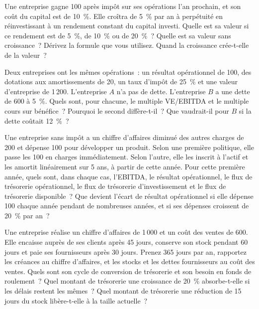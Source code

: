 \begin{question}\label{iq:iv2:valuation-and-financial-statements:12}
Une entreprise gagne 100 après impôt sur ses opérations l'an prochain, et son coût du capital est de 10~\%. Elle croîtra de 5~\% par an à perpétuité en réinvestissant à un rendement constant du capital investi. Quelle est sa valeur si ce rendement est de 5~\%, de 10~\% ou de 20~\%~? Quelle est sa valeur sans croissance~? Dérivez la formule que vous utilisez. Quand la croissance crée-t-elle de la valeur~?
\end{question}

\begin{question}\label{iq:iv2:valuation-and-financial-statements:13}
Deux entreprises ont les mêmes opérations~: un résultat opérationnel de 100, des dotations aux amortissements de 20, un taux d'impôt de 25~\% et une valeur d'entreprise de 1\,200. L'entreprise $A$ n'a pas de dette. L'entreprise $B$ a une dette de 600 à 5~\%. Quels sont, pour chacune, le multiple VE/EBITDA et le multiple cours sur bénéfice~? Pourquoi le second diffère-t-il~? Que vaudrait-il pour $B$ si la dette coûtait 12~\%~?
\end{question}

\begin{question}\label{iq:iv2:valuation-and-financial-statements:14}
Une entreprise sans impôt a un chiffre d'affaires diminué des autres charges de 200 et dépense 100 pour développer un produit. Selon une première politique, elle passe les 100 en charges immédiatement. Selon l'autre, elle les inscrit à l'actif et les amortit linéairement sur 5 ans, à partir de cette année. Pour cette première année, quels sont, dans chaque cas, l'EBITDA, le résultat opérationnel, le flux de trésorerie opérationnel, le flux de trésorerie d'investissement et le flux de trésorerie disponible~? Que devient l'écart de résultat opérationnel si elle dépense 100 chaque année pendant de nombreuses années, et si ses dépenses croissent de 20~\% par an~?
\end{question}

\begin{question}\label{iq:iv2:valuation-and-financial-statements:15}
Une entreprise réalise un chiffre d'affaires de 1\,000 et un coût des ventes de 600. Elle encaisse auprès de ses clients après 45 jours, conserve son stock pendant 60 jours et paie ses fournisseurs après 30 jours. Prenez 365 jours par an, rapportez les créances au chiffre d'affaires, et les stocks et les dettes fournisseurs au coût des ventes. Quels sont son cycle de conversion de trésorerie et son besoin en fonds de roulement~? Quel montant de trésorerie une croissance de 20~\% absorbe-t-elle si les délais restent les mêmes~? Quel montant de trésorerie une réduction de 15 jours du stock libère-t-elle à la taille actuelle~?
\end{question}

